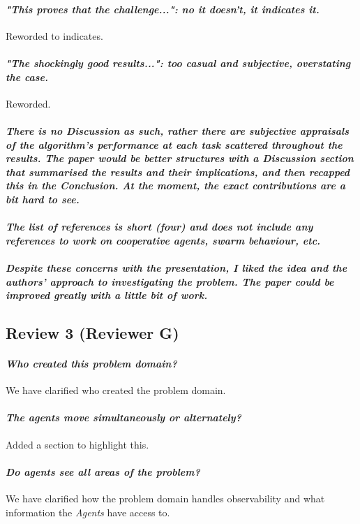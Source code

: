 \documentclass{article}
\begin{document}
\paragraph*{\textit{"This proves that the challenge...": no it doesn't, it indicates it.}}
Reworded to indicates.
\paragraph*{\textit{"The shockingly good results...": too casual and subjective, overstating the case.}}
Reworded. 
\paragraph*{\textit{There is no Discussion as such, rather there are subjective appraisals of the algorithm's performance at each task scattered throughout the results. The paper would be better structures with a Discussion section that summarised the results and their implications, and then recapped this in the Conclusion. At the moment, the exact contributions are a bit hard to see.}}
\paragraph*{\textit{The list of references is short (four) and does not include any references to work on cooperative agents, swarm behaviour, etc.}}
\paragraph*{\textit{Despite these concerns with the presentation, I liked the idea and the authors' approach to investigating the problem. The paper could be improved greatly with a little bit of work.}}
\subsection{Review 3 (Reviewer G)}
\paragraph*{\textit{Who created this problem domain?}}
We have clarified who created the problem domain.
\paragraph*{\textit{The agents move simultaneously or alternately?}}
Added a section to highlight this.
\paragraph*{\textit{Do agents see all areas of the problem?}}
We have clarified how the problem domain handles observability and what information the \emph{Agents} have access to.
\end{document}
